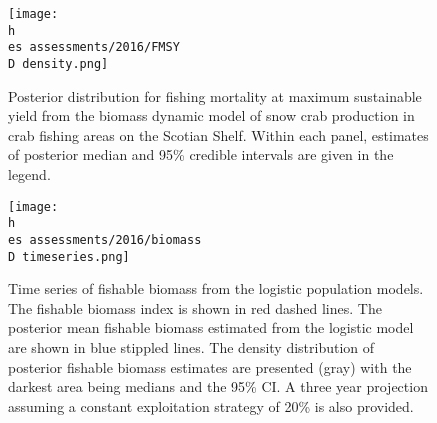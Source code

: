 \documentclass[11pt]{article}
\newcommand{\D}{.}
\newcommand{\h}{\string~/}
\newcommand{\es}{bio.data/bio.snowcrab/}
\begin{document}
\begin{figure}
    
    \texttt{[image: \\h \\es assessments/2016/FMSY\\D density.png]}
    \caption{Posterior distribution for fishing mortality at maximum sustainable yield from the biomass dynamic model of snow crab production in crab fishing areas on the Scotian Shelf. Within each panel, estimates of posterior median and 95\% credible intervals are given in the legend.}
  
\end{figure}
\clearpage



\begin{figure}
\centering
\texttt{[image: \\h \\es assessments/2016/biomass\\D timeseries.png]}\\ 
\caption{Time series of fishable biomass from the logistic population models. The fishable biomass index is shown in red dashed lines. The posterior mean fishable biomass estimated from the logistic model are shown in blue stippled lines. The density distribution of posterior fishable biomass estimates are presented (gray) with the darkest area being medians and the 95\% CI. A three year projection assuming a constant exploitation strategy of 20\% is also provided.}
\end{figure}
\clearpage
%
%
%
%
%
%
\end{document}
